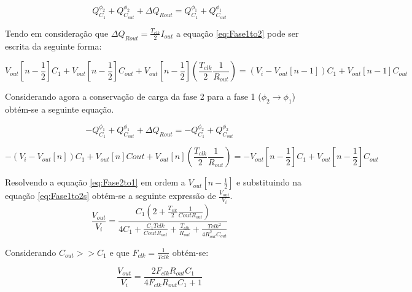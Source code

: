 \documentclass[../Main.tex]{article}
\begin{document}
\begin{equation}
\label{eq:Fase1to2}
Q^{\phi_2}_{C_1} + Q^{\phi_2}_{C_{out}} + \Delta Q_{Rout} = Q^{\phi_1}_{C_1} + Q^{\phi_1}_{C_{out}} 
\end{equation}
\vspace{5mm}

Tendo em consideração que $\Delta Q_{Rout} = \frac{T_{clk} }{2}I_{out}$ a equação \ref{eq:Fase1to2} pode ser escrita da seguinte forma:

\begin{equation}
\label{eq:Fase1to2s}
V_{out}[n-\frac{1}{2}]C_1 + V_{out}[n-\frac{1}{2}]C_{out} +  V_{out}[n-\frac{1}{2}](\frac{T_{clk} }{2}\frac{1}{R_{out}})=(V_i-V_{out}[n-1])C_1 + V_{out}[n-1]C_{out}
\end{equation}
\vspace{5mm}

Considerando agora a conservação de carga da fase 2 para a fase 1 ($\phi_2 \rightarrow \phi_1$) obtém-se a seguinte equação.

\begin{equation}
-Q^{\phi_1}_{C_1} + Q^{\phi_1}_{C_{out}} + \Delta Q_{Rout} = -Q^{\phi_2}_{C_1} + Q^{\phi_2}_{C_{out}}
\end{equation}

\begin{equation}
\label{eq:Fase2to1}
-(V_i-V_{out}[n])C_1+ V_{out}[n]C{out}+ V_{out}[n](\frac{T_{clk} }{2}\frac{1}{R_{out}}) = - V_{out}[n-\frac{1}{2}]C_1 + V_{out}[n-\frac{1}{2}]C_{out} 
\end{equation}
\vspace{5mm} 

Resolvendo a equação \ref{eq:Fase2to1} em ordem a $V_{out}[n-\frac{1}{2}]$ e substituindo na equação \ref{eq:Fase1to2s} obtém-se a seguinte expressão de $\frac{V_{out}}{V_i}$.
\begin{equation}
\label{eq:Buck(vo/vi)}
\frac{V_{out}}{V_i} = \frac{C_1(2 + \frac{T_{clk}}{2}\frac{1}{C{out}R_{out}})}{4C_1+ \frac{C_1T{clk}}{C{out}R_{out}} +  \frac{T_{clk}}{R_{out}} + \frac{T{clk}^2}{4R_{out}^2C_{out}} }
\end{equation}
\vspace{5mm} 

Considerando $C_{out}>> C_1$ e que $F_{clk} = \frac{1}{T{clk}}$ obtém-se:
\vspace{5mm}     

\begin{equation}
\label{eq:Buck(vo/vi)ap}
\frac{V_{out}}{V_i} = \frac{2F_{clk}R_{out}C_1}{4F_{clk}R_{out}C_1+ 1}
\end{equation}
\vspace{5mm}  
\end{document}
